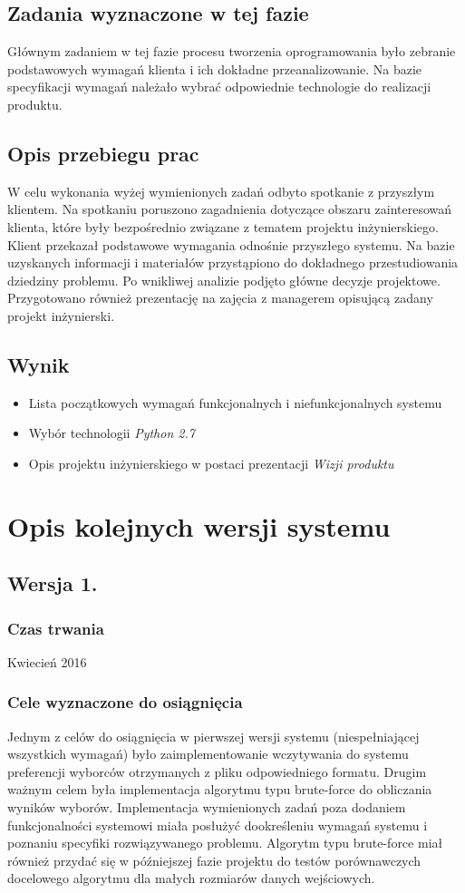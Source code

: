 \documentclass[pdflatex,11pt]{../aghdoc_version2}
\begin{document}
\subsection{Zadania wyznaczone w tej fazie}
Głównym zadaniem w tej fazie procesu tworzenia oprogramowania było zebranie
podstawowych wymagań klienta i ich dokładne przeanalizowanie. Na bazie specyfikacji
wymagań należało wybrać odpowiednie technologie do realizacji produktu.
\subsection{Opis przebiegu prac}
W celu wykonania wyżej wymienionych zadań odbyto spotkanie z przyszłym klientem. Na
spotkaniu poruszono zagadnienia dotyczące obszaru zainteresowań klienta, które były
bezpośrednio związane z tematem projektu inżynierskiego. Klient przekazał podstawowe wymagania odnośnie przyszłego systemu. Na bazie uzyskanych informacji i materiałów
przystąpiono do dokładnego przestudiowania dziedziny problemu. Po wnikliwej analizie
podjęto główne decyzje projektowe. Przygotowano również prezentację na zajęcia z
managerem opisującą zadany projekt inżynierski.
\subsection{Wynik}
\begin{itemize}
\item Lista początkowych wymagań funkcjonalnych i niefunkcjonalnych systemu
\item Wybór technologii \textit{Python 2.7}
\item Opis projektu inżynierskiego w postaci prezentacji \textit{Wizji produktu}
\end{itemize}

\section{Opis kolejnych wersji systemu}
\subsection{Wersja 1.}
\subsubsection{Czas trwania}
Kwiecień 2016
\subsubsection{Cele wyznaczone do osiągnięcia}
Jednym z celów do osiągnięcia w pierwszej wersji systemu (niespełniającej wszystkich
wymagań) było zaimplementowanie wczytywania do systemu preferencji wyborców
otrzymanych z pliku odpowiedniego formatu. Drugim ważnym celem była implementacja
algorytmu typu brute-force do obliczania wyników wyborów. Implementacja wymienionych
zadań poza dodaniem funkcjonalności systemowi miała posłużyć dookreśleniu wymagań
systemu i poznaniu specyfiki rozwiązywanego problemu. Algorytm typu brute-force miał
również przydać się w późniejszej fazie projektu do testów porównawczych docelowego
algorytmu dla małych rozmiarów danych wejściowych.
\end{document}
